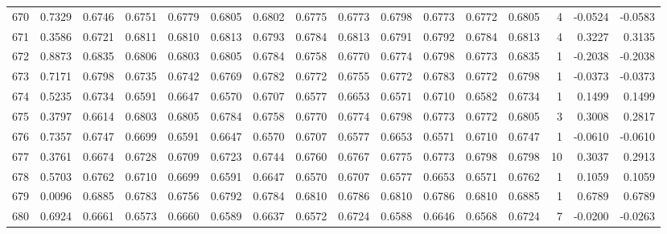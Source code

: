 \begin{tabular}{lrrrrrrrrrrrrrrr}
670 &      0.7329 &  0.6746 &  0.6751 &  0.6779 &  0.6805 &  0.6802 &  0.6775 &  0.6773 &  0.6798 &  0.6773 &   0.6772 &     0.6805 &      4 &                   -0.0524 &                    -0.0583 \\
671 &      0.3586 &  0.6721 &  0.6811 &  0.6810 &  0.6813 &  0.6793 &  0.6784 &  0.6813 &  0.6791 &  0.6792 &   0.6784 &     0.6813 &      4 &                    0.3227 &                     0.3135 \\
672 &      0.8873 &  0.6835 &  0.6806 &  0.6803 &  0.6805 &  0.6784 &  0.6758 &  0.6770 &  0.6774 &  0.6798 &   0.6773 &     0.6835 &      1 &                   -0.2038 &                    -0.2038 \\
673 &      0.7171 &  0.6798 &  0.6735 &  0.6742 &  0.6769 &  0.6782 &  0.6772 &  0.6755 &  0.6772 &  0.6783 &   0.6772 &     0.6798 &      1 &                   -0.0373 &                    -0.0373 \\
674 &      0.5235 &  0.6734 &  0.6591 &  0.6647 &  0.6570 &  0.6707 &  0.6577 &  0.6653 &  0.6571 &  0.6710 &   0.6582 &     0.6734 &      1 &                    0.1499 &                     0.1499 \\
675 &      0.3797 &  0.6614 &  0.6803 &  0.6805 &  0.6784 &  0.6758 &  0.6770 &  0.6774 &  0.6798 &  0.6773 &   0.6772 &     0.6805 &      3 &                    0.3008 &                     0.2817 \\
676 &      0.7357 &  0.6747 &  0.6699 &  0.6591 &  0.6647 &  0.6570 &  0.6707 &  0.6577 &  0.6653 &  0.6571 &   0.6710 &     0.6747 &      1 &                   -0.0610 &                    -0.0610 \\
677 &      0.3761 &  0.6674 &  0.6728 &  0.6709 &  0.6723 &  0.6744 &  0.6760 &  0.6767 &  0.6775 &  0.6773 &   0.6798 &     0.6798 &     10 &                    0.3037 &                     0.2913 \\
678 &      0.5703 &  0.6762 &  0.6710 &  0.6699 &  0.6591 &  0.6647 &  0.6570 &  0.6707 &  0.6577 &  0.6653 &   0.6571 &     0.6762 &      1 &                    0.1059 &                     0.1059 \\
679 &      0.0096 &  0.6885 &  0.6783 &  0.6756 &  0.6792 &  0.6784 &  0.6810 &  0.6786 &  0.6810 &  0.6786 &   0.6810 &     0.6885 &      1 &                    0.6789 &                     0.6789 \\
680 &      0.6924 &  0.6661 &  0.6573 &  0.6660 &  0.6589 &  0.6637 &  0.6572 &  0.6724 &  0.6588 &  0.6646 &   0.6568 &     0.6724 &      7 &                   -0.0200 &                    -0.0263 \\

\end{tabular}
